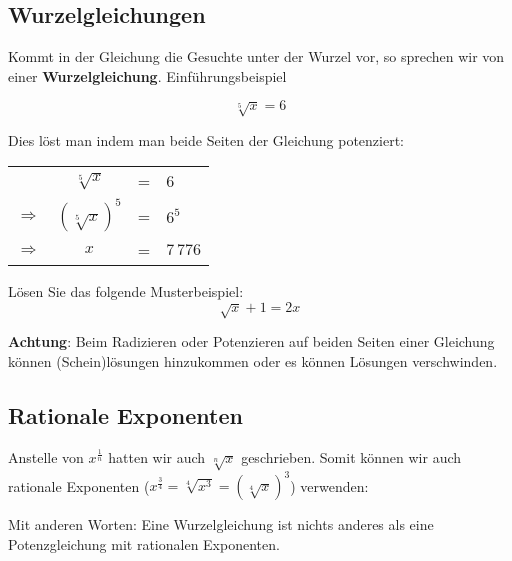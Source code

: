 \newpage
\subsection{Wurzelgleichungen}
Kommt in der Gleichung die Gesuchte unter der Wurzel vor, so sprechen
wir von einer \textbf{Wurzelgleichung}. Einführungsbeispiel


$$\sqrt[5]{x}=6$$


Dies löst man indem man beide Seiten der Gleichung potenziert:

\begin{tabular}{rccl}
  \             & $\sqrt[5]{x}$   &=&     6      \\
  $\Rightarrow$ & $(\sqrt[5]x)^5$ &=&  $6^5$     \\
  $\Rightarrow$ & $x$             &=& $7\,776$ 
\end{tabular}


Lösen Sie das folgende Musterbeispiel:
$$\sqrt{x}+1=2x$$



\textbf{Achtung}: Beim Radizieren oder Potenzieren auf beiden Seiten
einer Gleichung können (Schein)lösungen hinzukommen  oder es können Lösungen verschwinden.
\newpage



\subsection{Rationale Exponenten}

Anstelle von $x^{\frac{1}{n}}$ hatten wir auch $\sqrt[n]{x}$
geschrieben.
Somit können wir auch rationale Exponenten ($x^{\frac{3}{4}}  = \sqrt[4]{x^{3}} = (\sqrt[4]x)^3$) verwenden:

Mit anderen Worten: Eine Wurzelgleichung ist nichts anderes als eine
Potenzgleichung mit rationalen Exponenten.



